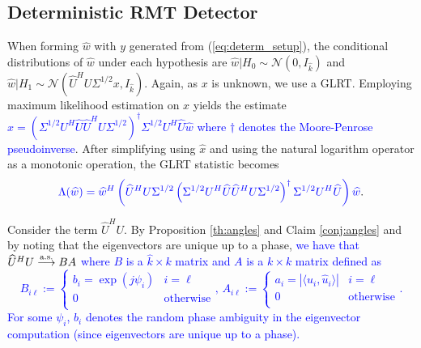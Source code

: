 \subsection{Deterministic RMT Detector}\label{sec:rmt_detec_determ}

When forming $\widehat{w}$ with $y$ generated from (\ref{eq:determ_setup}), the conditional distributions of $\widehat{w}$ under each hypothesis are $\widehat{w}|H_0\sim\mathcal{N}(0,I_{\widehat{k}})$ and $\widehat{w}|H_1\sim\mathcal{N}(\widehat{U}^HU\Sigma^{1/2} x, I_{\widehat{k}})$. Again, as $x$ is unknown, we use a GLRT. Employing maximum likelihood estimation on $x$ yields the estimate \textcolor{blue}{$\widehat{x}=\left(\Sigma^{1/2} U^H\widehat{U}\widehat{U}^HU\Sigma^{1/2}\right)^{\dagger}\Sigma^{1/2} U^H\widehat{U}\widehat{w}$ where $\dagger$ denotes the Moore-Penrose pseudoinverse}. After simplifying using $\widehat{x}$ and using the natural logarithm operator as a monotonic operation, the GLRT statistic becomes
\begin{equation*}
\textcolor{blue}{\Lambda(\widehat{w}) = \widehat{w}^H\left(\widehat{U}^HU\Sigma^{1/2}\left(\Sigma^{1/2} U^H\widehat{U}\widehat{U}^HU\Sigma^{1/2}\right)^{\dagger}\Sigma^{1/2} U^H\widehat{U}\right)\widehat{w}}.
\end{equation*}

Consider the term $\widehat{U}^HU$. By Proposition \ref{th:angles} and Claim \ref{conj:angles} and by noting that the eigenvectors are unique up to a phase, \textcolor{blue}{we have that $\widehat{U}^HU \overset{\textrm{a.s.}}{\longrightarrow} BA$ where $B$ is a $\widehat{k}\times k$ matrix and $A$ is a $k \times k$ matrix defined as
\small\begin{equation*}
B_{i\ell}:=\begin{cases} b_i=\exp(j\psi_i) & i=\ell \\ 0 & \text{otherwise} \\ \end{cases},\,A_{i\ell}:=\begin{cases} a_i=|\langle u_i,\widehat{u}_i\rangle| & i=\ell \\ 0 & \text{otherwise} \\ \end{cases}.
\end{equation*}\normalsize
For some $\psi_{i}$, $b_i$ denotes the random phase ambiguity in the eigenvector computation (since eigenvectors are unique up to a phase).}

